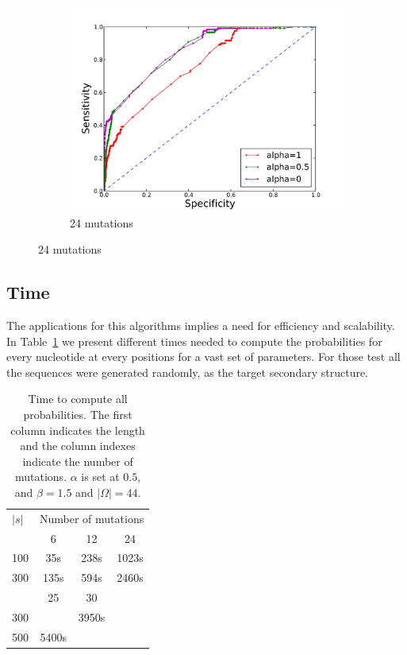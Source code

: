 \begin{figure}
\begin{subfigure}[b]{0.3\textwidth}
\includegraphics[width=1.2\textwidth]{figures/ROC_24.pdf}
\caption{24 mutations}
\end{subfigure}
\end{figure}




\subsection{Time}
The applications for this algorithms implies a need for efficiency
and scalability. In Table~\ref{tab:time} we
present different times needed to compute the probabilities for
 every nucleotide at every positions for a vast set of parameters. For those test
 all the sequences were generated randomly, as the target secondary structure.

\begin{table}
\begin{center}
\begin{tabular}{lccc}
$|s|$&\multicolumn{3}{c}{Number of mutations}\\\cline{2-4}
		 			  & 6   &  12  & 24\\\cline{2-4}
100  				& 35s  & 238s & 1023s\\
300  			& 135s & 594s &2460s\\\cline{2-4}
		 						& 25   & 30   &			\\\cline{2-4}
300       &      &  3950s&     \\
500         & 5400s&       &      \\
\end{tabular}
\end{center}
\caption{Time to compute all probabilities. The first column indicates the length and  the column indexes indicate the number
 of mutations. $\alpha$ is
set at $0.5$, and $\beta=1.5$ and $|\Omega|=44$.}
\label{tab:time}
\end{table}
